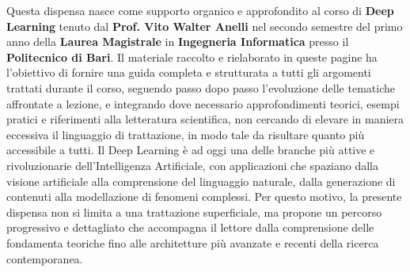 Questa dispensa nasce come supporto organico e approfondito al corso di \textbf{Deep Learning} tenuto dal \textbf{Prof. Vito Walter Anelli} nel secondo semestre del primo anno della \textbf{Laurea Magistrale} in \textbf{Ingegneria Informatica} presso il \textbf{Politecnico di Bari}. Il materiale raccolto e rielaborato in queste pagine ha l’obiettivo di fornire una guida completa e strutturata a tutti gli argomenti trattati durante il corso, seguendo passo dopo passo l’evoluzione delle tematiche affrontate a lezione, e integrando dove necessario approfondimenti teorici, esempi pratici e riferimenti alla letteratura scientifica, non cercando di elevare in maniera eccessiva il linguaggio di trattazione, in modo tale da risultare quanto più accessibile a tutti. Il Deep Learning è ad oggi una delle branche più attive e rivoluzionarie dell’Intelligenza Artificiale, con applicazioni che spaziano dalla visione artificiale alla comprensione del linguaggio naturale, dalla generazione di contenuti alla modellazione di fenomeni complessi. Per questo motivo, la presente dispensa non si limita a una trattazione superficiale, ma propone un percorso progressivo e dettagliato che accompagna il lettore dalla comprensione delle fondamenta teoriche fino alle architetture più avanzate e recenti della ricerca contemporanea.

